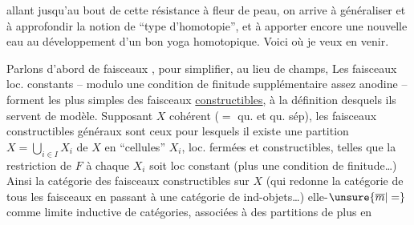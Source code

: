 allant jusqu'au bout\unsure{,} de cette résistance à fleur de peau, on arrive à généraliser et à approfondir la notion de ``type d'homotopie'', et à apporter encore une nouvelle eau au développement d'un bon yoga homotopique. Voici où je veux en venir.

Parlons d'abord de faisceaux , pour simplifier, au lieu de champs,  Les faisceaux loc. constants -- modulo une condition de finitude supplémentaire assez anodine -- forment les plus simples des faisceaux \uline{constructibles}, à la définition desquels ils servent de modèle. Supposant $X$ cohérent ($=$ qu.  et qu. sép), les faisceaux constructibles généraux sont ceux pour lesquels il existe une partition  $X=\bigcup\limits_{i\in I}X_i$ de $X$ en ``cellules''  $X_i$, loc. fermées et constructibles, telles que  la restriction de $F$ à chaque $X_i$ soit loc constant  (plus une condition de finitude\ldots) Ainsi la catégorie des faisceaux constructibles sur $X$  (qui redonne la catégorie de tous les faisceaux en passant à une catégorie de ind-objets\ldots)  elle-$\unsure{\overline m|=}$ comme limite inductive de catégories, associées à des partitions de plus en
